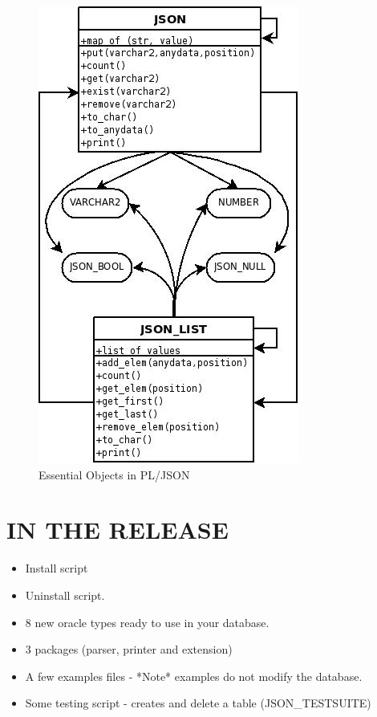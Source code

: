 \documentclass[11pt,twocolumn, a4paper]{article}
\begin{document}
\begin{figure}[!ht]
  \begin{center}
    \includegraphics[width=0.8\linewidth]{visual.jpg}
  \end{center} 
  \caption{Essential Objects in PL/JSON}
  \label{howjsonwork}
\end{figure}

\section*{IN THE RELEASE}
\begin{itemize}
\item Install script
\item Uninstall script.
\item 8 new oracle types ready to use in your database.
\item 3 packages (parser, printer and extension)
\item A few examples files - *Note* examples do not modify the database.
\item Some testing script - creates and delete a table (JSON\_TESTSUITE)
\end{itemize}
\end{document}
